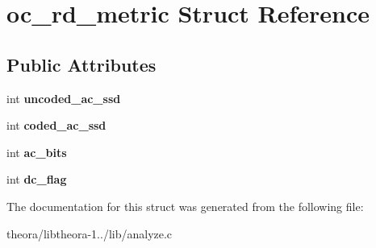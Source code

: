 \hypertarget{structoc__rd__metric}{\section{oc\+\_\+rd\+\_\+metric Struct Reference}
\label{structoc__rd__metric}
}
\subsection*{Public Attributes}
\begin{DoxyCompactItemize}
\item 
\hypertarget{structoc__rd__metric_ad38cb17d418bdae16e3edfb48119adb5}{int {\bfseries uncoded\+\_\+ac\+\_\+ssd}}\label{structoc__rd__metric_ad38cb17d418bdae16e3edfb48119adb5}

\item 
\hypertarget{structoc__rd__metric_aa0a2746c4387fb01b4c965b1965a302c}{int {\bfseries coded\+\_\+ac\+\_\+ssd}}\label{structoc__rd__metric_aa0a2746c4387fb01b4c965b1965a302c}

\item 
\hypertarget{structoc__rd__metric_a39455ffcb9bb01d172ffc752a594b766}{int {\bfseries ac\+\_\+bits}}\label{structoc__rd__metric_a39455ffcb9bb01d172ffc752a594b766}

\item 
\hypertarget{structoc__rd__metric_a71f075c8de71fe00c7e320e7b558aaee}{int {\bfseries dc\+\_\+flag}}\label{structoc__rd__metric_a71f075c8de71fe00c7e320e7b558aaee}

\end{DoxyCompactItemize}


The documentation for this struct was generated from the following file\+:\begin{DoxyCompactItemize}
\item 
theora/libtheora-\/1../lib/analyze.\+c\end{DoxyCompactItemize}
